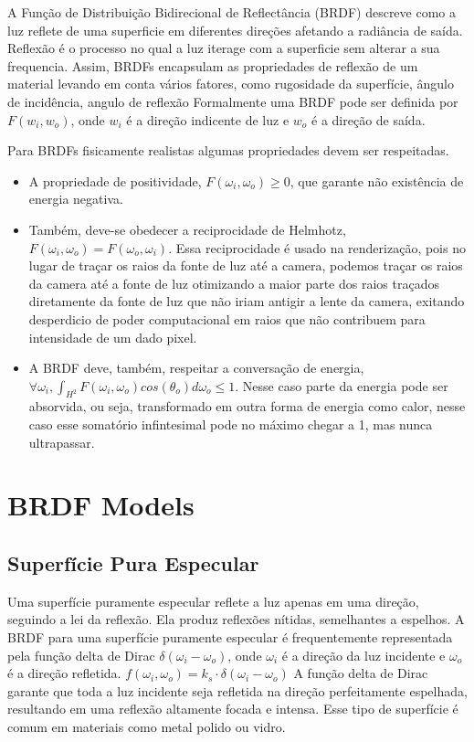\documentclass[english, 
               brazil, 
               bsc] %
               {dcomp-abntex2}
\begin{document}
A Função de Distribuição Bidirecional de Reflectância (BRDF) descreve como a luz reflete de uma superficie em diferentes direções afetando a radiância de saída. Reflexão é o processo no qual a luz iterage com a superficie sem alterar a sua frequencia. Assim, BRDFs encapsulam as propriedades de reflexão de um material levando em conta vários fatores, como rugosidade da superfície, ângulo de incidência, angulo de reflexão
Formalmente uma BRDF pode ser definida por $F(w_i, w_o)$, onde $w_i$ é a direção indicente de luz e $w_o$ é a direção de saída.

Para BRDFs fisicamente realistas algumas propriedades devem ser respeitadas.

\begin{itemize}
  \item A propriedade de positividade, $ F(\omega_i, \omega_o) \geq 0 $, que garante não existência de energia negativa. 

  \item Também, deve-se obedecer a reciprocidade de Helmhotz, $F(\omega_i, \omega_o) = F(\omega_o, \omega_i)$. Essa reciprocidade é usado na renderização, pois no lugar de traçar os raios da fonte de luz até a camera, podemos traçar os raios da camera até a fonte de luz otimizando a maior parte dos raios traçados diretamente da fonte de luz que não iriam antigir a lente da camera, exitando desperdicio de poder computacional em raios que não contribuem para intensidade de um dado pixel.

  \item A BRDF deve, também, respeitar a conversação de energia, $\forall  \omega_i, \int_{H^2}{F(\omega_i, \omega_o)cos(\theta_o) d\omega_o}\leq 1$. Nesse caso parte da energia pode ser absorvida, ou seja, transformado em outra forma de energia como calor, nesse caso esse somatório infintesimal pode no máximo chegar a 1, mas nunca ultrapassar.
\end{itemize}

\section{BRDF Models}


\subsection{Superfície Pura Especular}
Uma superfície puramente especular reflete a luz apenas em uma direção, seguindo a lei da reflexão. Ela produz reflexões nítidas, semelhantes a espelhos.
A BRDF para uma superfície puramente especular é frequentemente representada pela função delta de Dirac $\delta(\omega_i - \omega_o)$, onde $\omega_i$ é a direção da luz incidente e $\omega_o$ é a direção refletida.
$f(\omega_i, \omega_o) = k_s \cdot \delta(\omega_i - \omega_o)$
A função delta de Dirac garante que toda a luz incidente seja refletida na direção perfeitamente espelhada, resultando em uma reflexão altamente focada e intensa. Esse tipo de superfície é comum em materiais como metal polido ou vidro.
\end{document}
